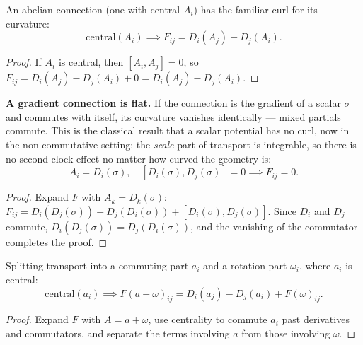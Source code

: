 \begin{theorem}
An abelian connection (one with central $A_i$) has the familiar curl for its curvature:
\[
\text{central}(A_i) \implies F_{ij} = D_i(A_j) - D_j(A_i).
\]
\begin{proof}
If $A_i$ is central, then $[A_i, A_j] = 0$, so $F_{ij} = D_i(A_j) - D_j(A_i) + 0 = D_i(A_j) - D_j(A_i)$.
\end{proof}
\end{theorem}

\begin{theorem}
\textbf{A gradient connection is flat.} If the connection is the gradient of a scalar $\sigma$ and commutes with itself, its curvature vanishes identically — mixed partials commute. This is the classical result that a scalar potential has no curl, now in the non-commutative setting: the \emph{scale} part of transport is integrable, so there is no second clock effect no matter how curved the geometry is:
\[
A_i = D_i(\sigma), \quad [D_i(\sigma), D_j(\sigma)] = 0 \implies F_{ij} = 0.
\]
\begin{proof}
Expand $F$ with $A_k = D_k(\sigma)$: $F_{ij} = D_i(D_j(\sigma)) - D_j(D_i(\sigma)) + [D_i(\sigma), D_j(\sigma)]$. Since $D_i$ and $D_j$ commute, $D_i(D_j(\sigma)) = D_j(D_i(\sigma))$, and the vanishing of the commutator completes the proof.
\end{proof}
\end{theorem}

\begin{theorem}
Splitting transport into a commuting part $a_i$ and a rotation part $\omega_i$, where $a_i$ is central:
\[
\text{central}(a_i) \implies F(a + \omega)_{ij} = D_i(a_j) - D_j(a_i) + F(\omega)_{ij}.
\]
\begin{proof}
Expand $F$ with $A = a + \omega$, use centrality to commute $a_i$ past derivatives and commutators, and separate the terms involving $a$ from those involving $\omega$.
\end{proof}
\end{theorem}

